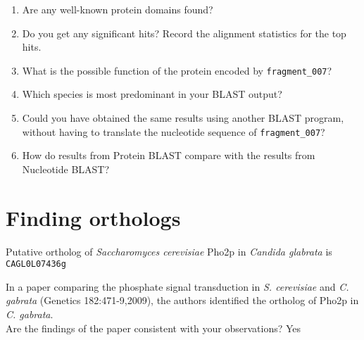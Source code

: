 \documentclass[a4paper,11pt]{article}
\begin{document}
\begin{enumerate}
\item Are any well-known protein domains found? 

\item Do you get any significant hits? Record the alignment statistics for the top hits. 

\item What is the possible function of the protein encoded by \texttt{fragment\_007}?

\item Which species is most predominant in your BLAST output?

\item Could you have obtained the same results using another BLAST program, without having to translate the nucleotide sequence of \texttt{fragment\_007}?

\item How do results from Protein BLAST compare with the results from Nucleotide BLAST?


\end{enumerate}

\section{Finding orthologs}

Putative ortholog of \emph{Saccharomyces cerevisiae} Pho2p in \emph{Candida glabrata} is \texttt{CAGL0L07436g}

In a paper comparing the phosphate signal transduction in \emph{S. cerevisiae} and \emph{C. gabrata} (Genetics 182:471-9,2009), the authors identified the ortholog of Pho2p in \emph{C. gabrata}. \\

Are the findings of the paper consistent with your observations?
Yes
\end{document}
